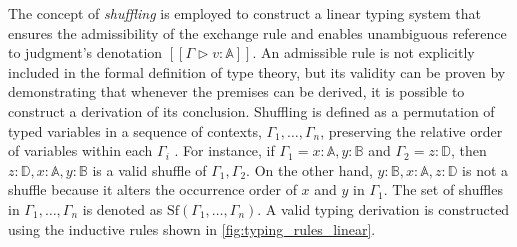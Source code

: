 The concept of \emph{shuffling} is employed to construct a linear typing system that ensures the admissibility of the exchange rule and enables unambiguous reference to judgment's denotation $[\![ \Gamma \triangleright v: \mathbb{A} ]\!]$. An admissible rule is not explicitly included in the formal definition of type theory, but its validity can be proven by demonstrating that whenever the premises can be derived, it is possible to construct a derivation of its conclusion. Shuffling is defined as a permutation of typed variables in a sequence of contexts, $\Gamma_1, \ldots, \Gamma_n$, preserving the relative order of variables within each $\Gamma_i$ \cite{shulman2019practical}. For instance, if $\Gamma_1=x:\mathbb{A}, y:\mathbb{B}$ and $\Gamma_2=z:\mathbb{D}$, then $z:\mathbb{D}, x:\mathbb{A}, y:\mathbb{B}$ is a valid shuffle of $\Gamma_1, \Gamma_2$. On the other hand, $y:\mathbb{B}, x:\mathbb{A}, z:\mathbb{D}$ is not a shuffle because it alters the occurrence order of $x$ and $y$ in $\Gamma_1$. The set of shuffles in $\Gamma_1, \ldots, \Gamma_n$ is denoted as $\text{Sf} (\Gamma_1, \ldots, \Gamma_n)$. A valid typing derivation is constructed using the inductive rules shown in \autoref{fig:typing_rules_linear}.
